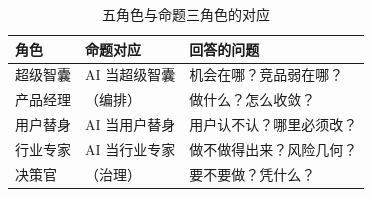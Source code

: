 \begin{table}[h]\centering\small
\renewcommand{\arraystretch}{1.2}
\begin{tabularx}{\linewidth}{p{2.4cm} p{3.2cm} X}
\toprule
\textbf{角色} & \textbf{命题对应} & \textbf{回答的问题} \\
\midrule
超级智囊 & AI 当超级智囊 & 机会在哪？竞品弱在哪？ \\
产品经理 & （编排） & 做什么？怎么收敛？ \\
用户替身 & AI 当用户替身 & 用户认不认？哪里必须改？ \\
行业专家 & AI 当行业专家 & 做不做得出来？风险几何？ \\
决策官 & （治理） & 要不要做？凭什么？ \\
\bottomrule
\end{tabularx}
\caption{五角色与命题三角色的对应}
\end{table}

